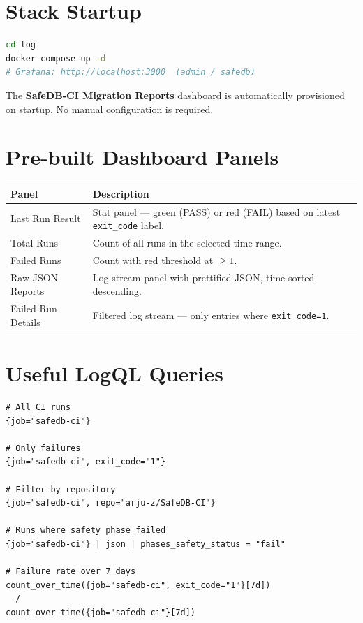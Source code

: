 \documentclass[12pt,a4paper]{report}
\begin{document}
\section{Stack Startup}

\begin{lstlisting}[language=bash]
cd log
docker compose up -d
# Grafana: http://localhost:3000  (admin / safedb)
\end{lstlisting}

The \textbf{SafeDB-CI Migration Reports} dashboard is automatically provisioned
on startup. No manual configuration is required.

\section{Pre-built Dashboard Panels}

\begin{center}
\begin{tabular}{@{}p{4.5cm}p{8cm}@{}}
\toprule
\textbf{Panel} & \textbf{Description} \\
\midrule
Last Run Result &
  Stat panel — green (PASS) or red (FAIL) based on latest \texttt{exit\_code} label. \\
Total Runs &
  Count of all runs in the selected time range. \\
Failed Runs &
  Count with red threshold at $\geq 1$. \\
Raw JSON Reports &
  Log stream panel with prettified JSON, time-sorted descending. \\
Failed Run Details &
  Filtered log stream — only entries where \texttt{exit\_code=1}. \\
\bottomrule
\end{tabular}
\end{center}

\section{Useful LogQL Queries}

\begin{lstlisting}[caption={LogQL examples}]
# All CI runs
{job="safedb-ci"}

# Only failures
{job="safedb-ci", exit_code="1"}

# Filter by repository
{job="safedb-ci", repo="arju-z/SafeDB-CI"}

# Runs where safety phase failed
{job="safedb-ci"} | json | phases_safety_status = "fail"

# Failure rate over 7 days
count_over_time({job="safedb-ci", exit_code="1"}[7d])
  /
count_over_time({job="safedb-ci"}[7d])
\end{lstlisting}
\end{document}
